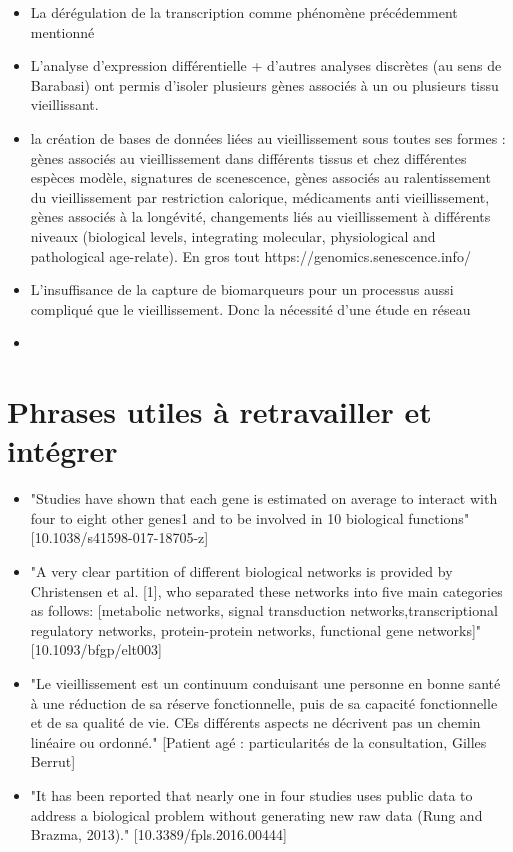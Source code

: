 \begin{itemize}
    \item La dérégulation de la transcription comme phénomène précédemment mentionné
    \item L'analyse d'expression différentielle + d'autres analyses discrètes (au sens de Barabasi) ont permis d'isoler plusieurs gènes associés à un ou plusieurs tissu vieillissant. \label{intro_biomarker_aging}
    \item la création de bases de données liées au vieillissement sous toutes ses formes : gènes associés au vieillissement dans différents tissus et chez différentes espèces modèle, signatures de scenescence, gènes associés au ralentissement du vieillissement par restriction calorique, médicaments anti vieillissement, gènes associés à la longévité, changements liés au vieillissement à différents niveaux (biological levels, integrating molecular, physiological and pathological age-relate). En gros tout https://genomics.senescence.info/
    \item L'insuffisance de la capture de biomarqueurs pour un processus aussi compliqué que le vieillissement. Donc la nécessité d'une étude en réseau
    \item 
    
\end{itemize}


\section*{Phrases utiles à retravailler et intégrer}

\begin{itemize}
\item "Studies have shown that each gene is estimated on average to interact with four to eight other genes1 and to be involved in 10 biological functions" [10.1038/s41598-017-18705-z]
\item "A very clear partition of different biological networks is provided by Christensen et al. [1], who separated these networks into five main categories as follows: [metabolic networks, signal transduction networks,transcriptional regulatory networks, protein-protein networks, functional gene networks]" [10.1093/bfgp/elt003]
\item "Le vieillissement est un continuum conduisant une personne en bonne santé à une réduction de sa réserve fonctionnelle, puis de sa capacité fonctionnelle et de sa qualité de vie. CEs différents aspects ne décrivent pas un chemin linéaire ou ordonné." [Patient agé : particularités de la consultation, Gilles Berrut]
\item "It has been reported that nearly one in four studies uses public data to address a biological problem without generating new raw data (Rung and Brazma, 2013)." [10.3389/fpls.2016.00444]
\end{itemize}


